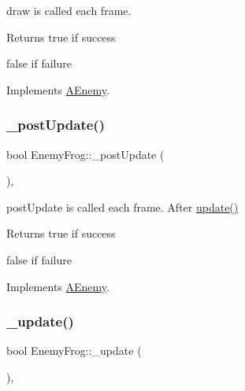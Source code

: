 draw is called each frame. 

\begin{DoxyReturn}{Returns}
true if success 

false if failure 
\end{DoxyReturn}


Implements \hyperlink{class_a_enemy_a70e3638b5ed8ecea2a087ffe16510dd2}{A\+Enemy}.

\mbox{\label{class_enemy_frog_ab151c31f6cc89cc77830f77b02cf9372}} 
\subsubsection{\texorpdfstring{\+\_\+post\+Update()}{\_postUpdate()}}
{\footnotesize\ttfamily bool Enemy\+Frog\+::\+\_\+post\+Update (\begin{DoxyParamCaption}{ }\end{DoxyParamCaption})\hspace{0.3cm}{\ttfamily [protected]}, {\ttfamily [virtual]}}



post\+Update is called each frame. After \hyperlink{class_a_enemy_a01e3b0313d6f29bf2cafe20f711c0550}{update()} 

\begin{DoxyReturn}{Returns}
true if success 

false if failure 
\end{DoxyReturn}


Implements \hyperlink{class_a_enemy_a78b010638f552c4ab11ff71e7b826b1b}{A\+Enemy}.

\mbox{\label{class_enemy_frog_a92b77b8686f21b8ef3ee3d1cb078a2d4}} 
\subsubsection{\texorpdfstring{\+\_\+update()}{\_update()}}
{\footnotesize\ttfamily bool Enemy\+Frog\+::\+\_\+update (\begin{DoxyParamCaption}{ }\end{DoxyParamCaption})\hspace{0.3cm}{\ttfamily [protected]}, {\ttfamily [virtual]}}



